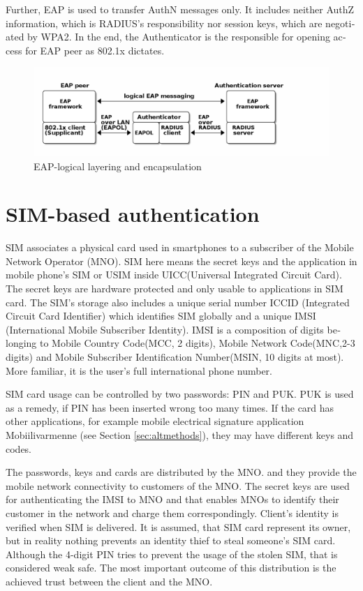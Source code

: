 \documentclass[12pt,a4paper,english]{tutthesis}
\begin{document}
\begin{otherlanguage}{english}
Further, EAP is used to transfer AuthN messages only.
It includes neither AuthZ information, which is RADIUS's
responsibility nor session keys, which are negotiated by WPA2.  In the
end,
the Authenticator is the responsible for opening access for EAP peer as 802.1x
dictates.







\begin{figure}[htb]
\centering
\includegraphics[width=.9\linewidth]{eap-layer.png}
\caption{\label{fig:eap-layers}EAP-logical layering and encapsulation}
\end{figure}



\section{SIM-based authentication}
\label{sec-2-5}
\label{sec:sim-based-auth}
SIM associates a physical card used in smartphones to
a subscriber of the Mobile Network Operator (MNO).
SIM here means the secret keys and the application in mobile phone's
SIM or USIM inside UICC(Universal Integrated Circuit Card).
The secret keys are hardware protected and only usable to applications
in SIM card.
The SIM's storage also includes a unique serial number ICCID 
(Integrated Circuit Card Identifier) which identifies SIM globally
and a unique IMSI (International Mobile Subscriber Identity). IMSI is
a composition of digits belonging to Mobile Country Code(MCC, 2
digits), Mobile Network Code(MNC,2-3 digits) and Mobile Subscriber
Identification Number(MSIN, 10 digits at most).
More familiar, it is the user's full international phone number.


SIM card usage can be controlled by two passwords: PIN and PUK.  PUK
is used as a remedy, if PIN has been inserted wrong too many times.
If the card has other applications, for example mobile electrical
signature application Mobiilivarmenne (see Section \ref{sec:altmethods}),
they may have different keys and codes.


The passwords, keys and cards are distributed by the MNO.
 and they 
provide the mobile network connectivity to customers of the MNO.  The
secret keys are used for authenticating the IMSI to MNO and that
enables MNOs to identify their customer in the network and charge them
correspondingly.  Client's identity is verified when SIM is delivered.
It is assumed, that SIM card represent its owner, but in reality
nothing prevents an identity thief to steal someone's SIM
card. Although the 4-digit PIN tries to prevent the usage of the
stolen SIM, that is considered weak safe\cite[p.31]{aaa-nakhjiri2005}.
The most important outcome of this distribution is the achieved trust
between the client and the MNO.



\end{otherlanguage}
\end{document}
